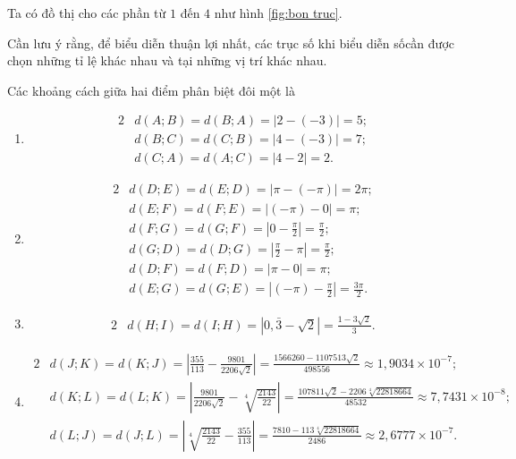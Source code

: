 \documentclass[a4paper, titlepage, openany]{book}
\begin{document}
Ta có đồ thị cho các phần từ $1$ đến $4$ như hình \ref{fig:bon truc}.

Cần lưu ý rằng, để biểu diễn thuận lợi nhất, các trục số khi biểu diễn sốcần được chọn những tỉ lệ khác nhau và tại những vị trí khác nhau.

Các khoảng cách giữa hai điểm phân biệt đôi một là
\begin{enumerate}
   \item \begin{alignat*}{2}
      &d(A;B) = d(B;A) = \left|2 - (-3)\right| = 5; \\
      &d(B;C) = d(C;B) = \left|4 - (-3)\right| = 7; \\
      &d(C;A) = d(A;C) = \left|4 - 2\right| = 2.
   \end{alignat*}
   \item \begin{alignat*}{2}
      &d(D;E) = d(E;D) = \left|\pi - (-\pi)\right| = 2\pi; \\
      &d(E;F) = d(F;E) = \left|(-\pi) - 0\right| = \pi; \\
      &d(F;G) = d(G;F) = \left|0 - \frac{\pi}{2}\right| = \frac{\pi}{2}; \\
      &d(G;D) = d(D;G) = \left|\frac{\pi}{2} - \pi\right| = \frac{\pi}{2}; \\
      &d(D;F) = d(F;D) = \left|\pi - 0\right| = \pi;\\
      &d(E;G) = d(G;E) = \left|(-\pi) - \frac{\pi}{2}\right| = \frac{3\pi}{2}.
   \end{alignat*}
   \item \begin{alignat*}{2}
      &d(H;I) = d(I;H) = \left|0{,}\bar{3} - \sqrt{2}\right| = \frac{1-3\sqrt{2}}{3}.
   \end{alignat*}
   \item \begin{alignat*}{2}
      &d(J;K) = d(K;J) = \left|\frac{355}{113} - \frac{9801}{2206\sqrt{2}}\right| = \frac{1566260-1107513\sqrt{2}}{498556} \approx 1{,}9034\times 10^{-7}; \\
      &d(K;L) = d(L;K) = \left|\frac{9801}{2206\sqrt{2}} - \sqrt[4]{\frac{2143}{22}}\right| = \frac{107811\sqrt{2}-2206\sqrt[4]{22818664}}{48532} \approx 7{,}7431\times 10^{-8}; \\
      &d(L;J) = d(J;L) = \left|\sqrt[4]{\frac{2143}{22}} - \frac{355}{113}\right| = \frac{7810-113\sqrt[4]{22818664}}{2486} \approx 2{,}6777\times 10^{-7}.
   \end{alignat*}
\end{enumerate}
\end{document}
